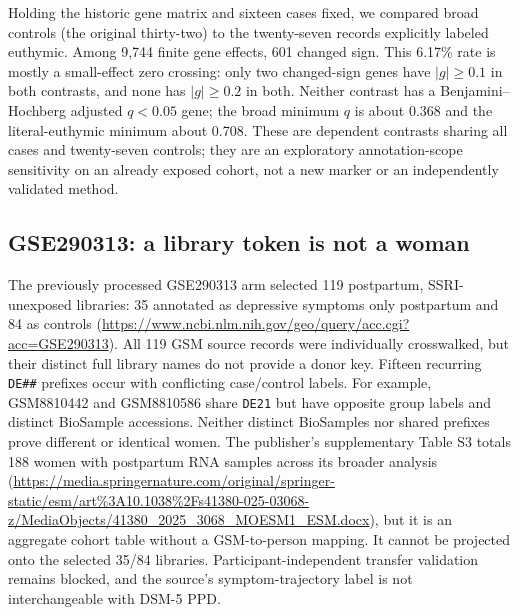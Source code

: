 \documentclass[11pt,a4paper]{article}
\begin{document}
Holding the historic gene matrix and sixteen cases fixed, we compared broad controls (the original thirty-two) to the twenty-seven records explicitly labeled euthymic. Among 9,744 finite gene effects, 601 changed sign. This 6.17\% rate is mostly a small-effect zero crossing: only two changed-sign genes have $|g|\geq0.1$ in both contrasts, and none has $|g|\geq0.2$ in both. Neither contrast has a Benjamini--Hochberg adjusted $q<0.05$ gene; the broad minimum $q$ is about 0.368 and the literal-euthymic minimum about 0.708. These are dependent contrasts sharing all cases and twenty-seven controls; they are an exploratory annotation-scope sensitivity on an already exposed cohort, not a new marker or an independently validated method.

\subsection{GSE290313: a library token is not a woman}
The previously processed GSE290313 arm selected 119 postpartum, SSRI-unexposed libraries: 35 annotated as depressive symptoms only postpartum and 84 as controls (\url{https://www.ncbi.nlm.nih.gov/geo/query/acc.cgi?acc=GSE290313}). All 119 GSM source records were individually crosswalked, but their distinct full library names do not provide a donor key. Fifteen recurring \texttt{DE\#\#} prefixes occur with conflicting case/control labels. For example, GSM8810442 and GSM8810586 share \texttt{DE21} but have opposite group labels and distinct BioSample accessions. Neither distinct BioSamples nor shared prefixes prove different or identical women. The publisher's supplementary Table S3 totals 188 women with postpartum RNA samples across its broader analysis (\url{https://media.springernature.com/original/springer-static/esm/art%3A10.1038%2Fs41380-025-03068-z/MediaObjects/41380_2025_3068_MOESM1_ESM.docx}), but it is an aggregate cohort table without a GSM-to-person mapping. It cannot be projected onto the selected 35/84 libraries. Participant-independent transfer validation remains blocked, and the source's symptom-trajectory label is not interchangeable with DSM-5 PPD.
\end{document}
